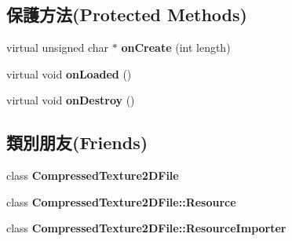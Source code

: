 \subsection*{保護方法(Protected Methods)}
\begin{DoxyCompactItemize}
\item 
virtual unsigned char $\ast$ {\bfseries on\+Create} (int length)\hypertarget{class_i_dream_sky_1_1_compressed_texture2_d_file_1_1_resource_a14c2568bbe4b3a6ab86f87fdb3eb1816}{}\label{class_i_dream_sky_1_1_compressed_texture2_d_file_1_1_resource_a14c2568bbe4b3a6ab86f87fdb3eb1816}

\item 
virtual void {\bfseries on\+Loaded} ()\hypertarget{class_i_dream_sky_1_1_compressed_texture2_d_file_1_1_resource_aa7e8485f94e061f2207ccb0fa2940d74}{}\label{class_i_dream_sky_1_1_compressed_texture2_d_file_1_1_resource_aa7e8485f94e061f2207ccb0fa2940d74}

\item 
virtual void {\bfseries on\+Destroy} ()\hypertarget{class_i_dream_sky_1_1_compressed_texture2_d_file_1_1_resource_a1d2170ee6b6ea8f8b0d20a955889b7ed}{}\label{class_i_dream_sky_1_1_compressed_texture2_d_file_1_1_resource_a1d2170ee6b6ea8f8b0d20a955889b7ed}

\end{DoxyCompactItemize}
\subsection*{類別朋友(Friends)}
\begin{DoxyCompactItemize}
\item 
class {\bfseries Compressed\+Texture2\+D\+File}\hypertarget{class_i_dream_sky_1_1_compressed_texture2_d_file_1_1_resource_a65b38357d7981d5bca6b1249ed028b3d}{}\label{class_i_dream_sky_1_1_compressed_texture2_d_file_1_1_resource_a65b38357d7981d5bca6b1249ed028b3d}

\item 
class {\bfseries Compressed\+Texture2\+D\+File\+::\+Resource}\hypertarget{class_i_dream_sky_1_1_compressed_texture2_d_file_1_1_resource_a9dd0c389cf2c997f63452a4fe72c57aa}{}\label{class_i_dream_sky_1_1_compressed_texture2_d_file_1_1_resource_a9dd0c389cf2c997f63452a4fe72c57aa}

\item 
class {\bfseries Compressed\+Texture2\+D\+File\+::\+Resource\+Importer}\hypertarget{class_i_dream_sky_1_1_compressed_texture2_d_file_1_1_resource_a351231df6cf0da6c427cc49df05e1154}{}\label{class_i_dream_sky_1_1_compressed_texture2_d_file_1_1_resource_a351231df6cf0da6c427cc49df05e1154}

\end{DoxyCompactItemize}

